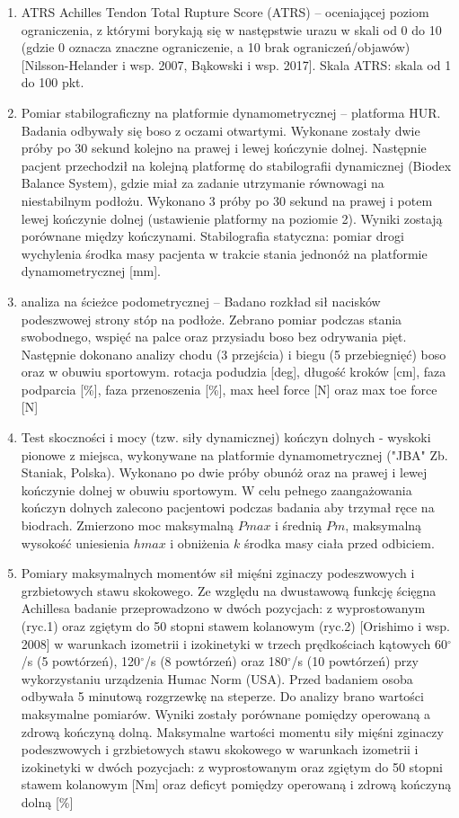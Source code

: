 \begin{enumerate}
	\item ATRS Achilles Tendon Total Rupture Score (ATRS) -- oceniającej poziom ograniczenia, z którymi borykają się w następstwie urazu w skali od 0 do 10 (gdzie 0 oznacza znaczne ograniczenie, a 10 brak ograniczeń/objawów) [Nilsson-Helander i wsp. 2007, Bąkowski i wsp. 2017]. Skala ATRS: skala od 1 do 100 pkt.
	\item Pomiar stabilograficzny na platformie dynamometrycznej -- platforma HUR. Badania odbywały się boso z oczami otwartymi. Wykonane zostały dwie próby po 30 sekund kolejno na prawej i lewej kończynie dolnej. Następnie pacjent przechodził na kolejną platformę do stabilografii dynamicznej (Biodex Balance System), gdzie miał za zadanie utrzymanie równowagi na niestabilnym podłożu. Wykonano 3 próby po 30 sekund na prawej i potem lewej kończynie dolnej (ustawienie platformy na poziomie 2). Wyniki zostają porównane między kończynami. Stabilografia statyczna: pomiar drogi wychylenia środka masy pacjenta w trakcie stania jednonóż na platformie dynamometrycznej [mm].
	\item analiza na ścieżce podometrycznej -- Badano rozkład sił nacisków podeszwowej strony stóp na podłoże. Zebrano pomiar podczas stania swobodnego, wspięć na palce oraz przysiadu boso bez odrywania pięt. Następnie dokonano analizy chodu (3 przejścia) i biegu (5 przebiegnięć) boso oraz w obuwiu sportowym. rotacja podudzia [deg], długość kroków [cm], faza podparcia [\%], faza przenoszenia [\%], max heel force [N] oraz max toe force [N]
	\item Test skoczności i mocy (tzw. siły dynamicznej) kończyn dolnych - wyskoki pionowe z miejsca, wykonywane na platformie dynamometrycznej ("JBA" Zb. Staniak, Polska). Wykonano po dwie próby obunóż oraz na prawej i lewej kończynie dolnej w obuwiu sportowym. W celu pełnego zaangażowania kończyn dolnych zalecono pacjentowi podczas badania aby trzymał ręce na biodrach. Zmierzono moc maksymalną $Pmax$ i średnią $Pm$, maksymalną wysokość uniesienia $hmax$ i obniżenia $k$ środka masy ciała przed odbiciem.
	\item Pomiary maksymalnych momentów sił mięśni zginaczy podeszwowych i grzbietowych stawu skokowego. Ze względu na dwustawową funkcję ścięgna Achillesa badanie przeprowadzono w dwóch pozycjach: z wyprostowanym (ryc.1) oraz zgiętym do 50 stopni stawem kolanowym (ryc.2) [Orishimo i wsp. 2008] w warunkach izometrii i izokinetyki w trzech prędkościach kątowych 60$^\circ$/s (5 powtórzeń), 120$^\circ$/s (8 powtórzeń) oraz 180$^\circ$/s (10 powtórzeń) przy wykorzystaniu urządzenia Humac Norm (USA). Przed badaniem osoba odbywała 5 minutową rozgrzewkę na steperze. Do analizy brano wartości maksymalne pomiarów. Wyniki zostały porównane pomiędzy operowaną a zdrową kończyną dolną. Maksymalne wartości momentu siły mięśni zginaczy podeszwowych i grzbietowych stawu skokowego w warunkach izometrii i izokinetyki w dwóch pozycjach: z wyprostowanym oraz zgiętym do 50 stopni stawem kolanowym [Nm] oraz deficyt pomiędzy operowaną i zdrową kończyną dolną [\%]
\end{enumerate}

